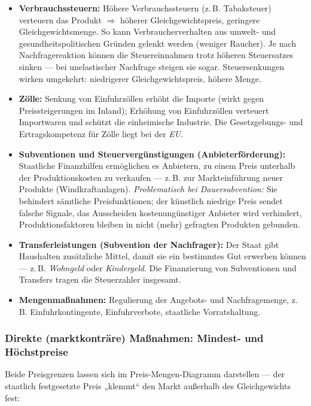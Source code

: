 \documentclass[11pt, a4paper]{article}
\begin{document}
\begin{itemize}
  \item \textbf{Verbrauchssteuern:} Höhere Verbrauchssteuern (z.\,B. Tabaksteuer)
    verteuern das Produkt $\Rightarrow$ höherer Gleichgewichtspreis, geringere
    Gleichgewichtsmenge. So kann Verbraucherverhalten aus umwelt- und
    gesundheitspolitischen Gründen gelenkt werden (weniger Raucher). Je nach
    Nachfragereaktion können die Steuereinnahmen trotz höheren Steuersatzes sinken ---
    bei unelastischer Nachfrage steigen sie sogar. Steuersenkungen wirken umgekehrt:
    niedrigerer Gleichgewichtspreis, höhere Menge.
  \item \textbf{Zölle:} Senkung von Einfuhrzöllen erhöht die Importe (wirkt gegen
    Preissteigerungen im Inland); Erhöhung von Einfuhrzöllen verteuert Importwaren und
    schützt die einheimische Industrie. Die Gesetzgebungs- und Ertragskompetenz für Zölle
    liegt bei der \emph{EU}.
  \item \textbf{Subventionen und Steuervergünstigungen (Anbieterförderung):} Staatliche
    Finanzhilfen ermöglichen es Anbietern, zu einem Preis unterhalb der
    Produktionskosten zu verkaufen --- z.\,B. zur Markteinführung neuer Produkte
    (Windkraftanlagen). \emph{Problematisch bei Dauersubvention:} Sie behindert sämtliche
    Preisfunktionen; der künstlich niedrige Preis sendet falsche Signale, das Ausscheiden
    kostenungünstiger Anbieter wird verhindert, Produktionsfaktoren bleiben in nicht
    (mehr) gefragten Produkten gebunden.
  \item \textbf{Transferleistungen (Subvention der Nachfrager):} Der Staat gibt Haushalten
    zusätzliche Mittel, damit sie ein bestimmtes Gut erwerben können --- z.\,B.
    \emph{Wohngeld} oder \emph{Kindergeld}. Die Finanzierung von Subventionen und
    Transfers tragen die Steuerzahler insgesamt.
  \item \textbf{Mengenmaßnahmen:} Regulierung der Angebots- und Nachfragemenge, z.\,B.
    Einfuhrkontingente, Einfuhrverbote, staatliche Vorratshaltung.
\end{itemize}

\subsubsection{Direkte (marktkonträre) Maßnahmen: Mindest- und Höchstpreise}

Beide Preisgrenzen lassen sich im Preis-Mengen-Diagramm darstellen --- der staatlich
festgesetzte Preis „klemmt`` den Markt außerhalb des Gleichgewichts fest:
\end{document}
